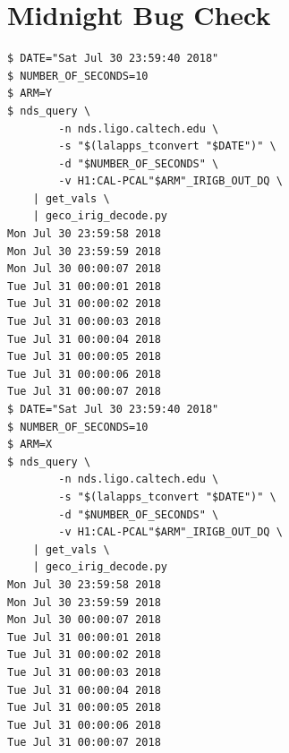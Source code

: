 \documentclass{article}
\begin{document}
\section{Midnight Bug Check}
\label{sec:midnightbug}
\lstset{language=Bash}
\begin{lstlisting}
$ DATE="Sat Jul 30 23:59:40 2018"
$ NUMBER_OF_SECONDS=10
$ ARM=Y
$ nds_query \
    	-n nds.ligo.caltech.edu \
    	-s "$(lalapps_tconvert "$DATE")" \
    	-d "$NUMBER_OF_SECONDS" \
    	-v H1:CAL-PCAL"$ARM"_IRIGB_OUT_DQ \
    | get_vals \
    | geco_irig_decode.py
Mon Jul 30 23:59:58 2018
Mon Jul 30 23:59:59 2018
Mon Jul 30 00:00:07 2018
Tue Jul 31 00:00:01 2018
Tue Jul 31 00:00:02 2018
Tue Jul 31 00:00:03 2018
Tue Jul 31 00:00:04 2018
Tue Jul 31 00:00:05 2018
Tue Jul 31 00:00:06 2018
Tue Jul 31 00:00:07 2018
$ DATE="Sat Jul 30 23:59:40 2018"
$ NUMBER_OF_SECONDS=10
$ ARM=X
$ nds_query \
    	-n nds.ligo.caltech.edu \
    	-s "$(lalapps_tconvert "$DATE")" \
    	-d "$NUMBER_OF_SECONDS" \
    	-v H1:CAL-PCAL"$ARM"_IRIGB_OUT_DQ \
    | get_vals \
    | geco_irig_decode.py
Mon Jul 30 23:59:58 2018
Mon Jul 30 23:59:59 2018
Mon Jul 30 00:00:07 2018
Tue Jul 31 00:00:01 2018
Tue Jul 31 00:00:02 2018
Tue Jul 31 00:00:03 2018
Tue Jul 31 00:00:04 2018
Tue Jul 31 00:00:05 2018
Tue Jul 31 00:00:06 2018
Tue Jul 31 00:00:07 2018
\end{lstlisting}
\clearpage
\end{document}
